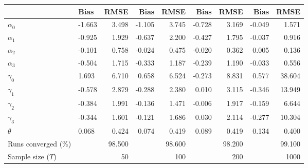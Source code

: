 
\begin{tabular}[t]{llrrrrrrr}
\toprule
  & Bias & RMSE & Bias & RMSE & Bias & RMSE & Bias & RMSE\\
\midrule
$\alpha_{0}$ & -1.663 & 3.498 & -1.105 & 3.745 & -0.728 & 3.169 & -0.049 & 1.571\\
$\alpha_{1}$ & -0.925 & 1.929 & -0.637 & 2.200 & -0.427 & 1.795 & -0.037 & 0.916\\
$\alpha_{2}$ & -0.101 & 0.758 & -0.024 & 0.475 & -0.020 & 0.362 & 0.005 & 0.136\\
$\alpha_{3}$ & -0.504 & 1.715 & -0.333 & 1.187 & -0.239 & 1.190 & -0.033 & 0.556\\
$\gamma_{0}$ & 1.693 & 6.710 & 0.658 & 6.524 & -0.273 & 8.831 & 0.577 & 38.604\\
$\gamma_{1}$ & -0.578 & 2.879 & -0.288 & 2.380 & 0.010 & 3.115 & -0.346 & 13.949\\
$\gamma_{2}$ & -0.384 & 1.991 & -0.136 & 1.471 & -0.006 & 1.917 & -0.159 & 6.644\\
$\gamma_{3}$ & -0.344 & 1.601 & -0.121 & 1.686 & 0.030 & 2.114 & -0.277 & 10.304\\
$\theta$ & 0.068 & 0.424 & 0.074 & 0.419 & 0.089 & 0.419 & 0.134 & 0.400\\
Runs converged (\%) &  & 98.500 &  & 98.600 &  & 98.200 &  & 99.100\\
Sample size ($T$) &  & 50 &  & 100 &  & 200 &  & 1000\\
\bottomrule
\end{tabular}
